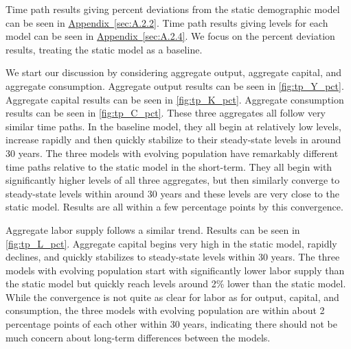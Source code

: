 \documentclass[10pt]{article}
\renewcommand{\thesection}{\arabic{section}}
\renewcommand{\thesubsection}{\thesection.\arabic{subsection}}
\newcommand{\aref}[1]{\hyperref[#1]{Appendix~\ref{#1}}}
\renewcommand{\section}[2][]{\oldsection[#1]{#2}\index{#1}\label{sec:\thesection}}
\renewcommand{\subsection}[2][]{\oldsubsection[#1]{#2}\index{#1}\label{sec:\thesubsection}}
\numberwithin{equation}{subsection}
\begin{document}


\subsection{Time Path}
\par Time path results giving percent deviations from the static demographic model can be seen in \aref{sec:A.2.2}. Time path results giving levels for each model can be seen in \aref{sec:A.2.4}. We focus on the percent deviation results, treating the static model as a baseline.

\par We start our discussion by considering aggregate output, aggregate capital, and aggregate consumption. Aggregate output results can be seen in \autoref{fig:tp_Y_pct}. Aggregate capital results can be seen in \autoref{fig:tp_K_pct}. Aggregate consumption results can be seen in \autoref{fig:tp_C_pct}. These three aggregates all follow very similar time paths. In the baseline model, they all begin at relatively low levels, increase rapidly and then quickly stabilize to their steady-state levels in around 30 years. The three models with evolving population have remarkably different time paths relative to the static model in the short-term. They all begin with significantly higher levels of all three aggregates, but then similarly converge to steady-state levels within around 30 years and these levels are very close to the static model. Results are all within a few percentage points by this convergence.

\par Aggregate labor supply follows a similar trend. Results can be seen in \autoref{fig:tp_L_pct}. Aggregate capital begins very high in the static model, rapidly declines, and quickly stabilizes to steady-state levels within 30 years. The three models with evolving population start with significantly lower labor supply than the static model but quickly reach levels around 2\% lower than the static model. While the convergence is not quite as clear for labor as for output, capital, and consumption, the three models with evolving population are within about 2 percentage points of each other within 30 years, indicating there should not be much concern about long-term differences between the models.
\end{document}
